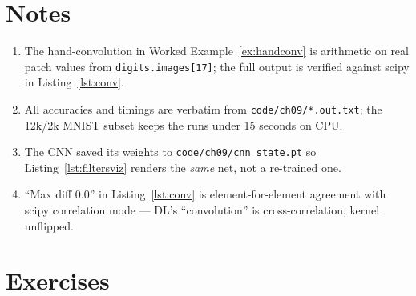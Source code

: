 \section*{Notes}
\begin{enumerate}
\item[\textbf{1.}] The hand-convolution in Worked Example~\ref{ex:handconv}
is arithmetic on real patch values from \texttt{digits.images[17]};
the full output is verified against scipy in Listing~\ref{lst:conv}.
\item[\textbf{2.}] All accuracies and timings are verbatim from
\texttt{code/ch09/*.out.txt}; the 12k/2k MNIST subset keeps the runs
under 15 seconds on CPU.
\item[\textbf{3.}] The CNN saved its weights to
\texttt{code/ch09/cnn\_state.pt} so Listing~\ref{lst:filtersviz}
renders the \emph{same} net, not a re-trained one.
\item[\textbf{4.}] ``Max diff 0.0'' in Listing~\ref{lst:conv} is
element-for-element agreement with scipy correlation mode --- DL's
``convolution'' is cross-correlation, kernel unflipped.
\end{enumerate}

\section{Exercises}
\label{sec:cnnexercises}


